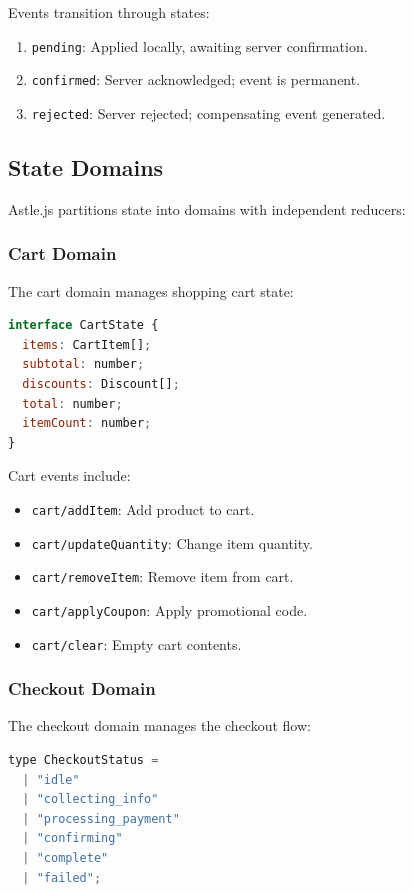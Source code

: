 \documentclass[11pt,twocolumn]{article}
\begin{document}
Events transition through states:
\begin{enumerate}
\item \texttt{pending}: Applied locally, awaiting server confirmation.
\item \texttt{confirmed}: Server acknowledged; event is permanent.
\item \texttt{rejected}: Server rejected; compensating event generated.
\end{enumerate}

\subsection{State Domains}

Astle.js partitions state into domains with independent reducers:

\subsubsection{Cart Domain}

The cart domain manages shopping cart state:

\begin{lstlisting}[language=JavaScript,caption=Cart state shape]
interface CartState {
  items: CartItem[];
  subtotal: number;
  discounts: Discount[];
  total: number;
  itemCount: number;
}
\end{lstlisting}

Cart events include:
\begin{itemize}
\item \texttt{cart/addItem}: Add product to cart.
\item \texttt{cart/updateQuantity}: Change item quantity.
\item \texttt{cart/removeItem}: Remove item from cart.
\item \texttt{cart/applyCoupon}: Apply promotional code.
\item \texttt{cart/clear}: Empty cart contents.
\end{itemize}

\subsubsection{Checkout Domain}

The checkout domain manages the checkout flow:

\begin{lstlisting}[language=JavaScript,caption=Checkout state machine]
type CheckoutStatus =
  | "idle"
  | "collecting_info"
  | "processing_payment"
  | "confirming"
  | "complete"
  | "failed";
\end{lstlisting}
\end{document}
